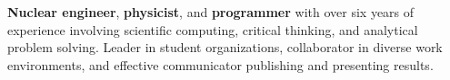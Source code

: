 

\begin{minipage}{\textwidth}
\begin{justify}
	{\normalsize
	\textbf{Nuclear engineer}, \textbf{physicist}, and \textbf{programmer} with over six years of experience involving scientific computing, critical thinking, and analytical problem solving.
	Leader in student organizations, collaborator in diverse work environments, and effective communicator publishing and presenting results.
	}
\end{justify}
\end{minipage}%
